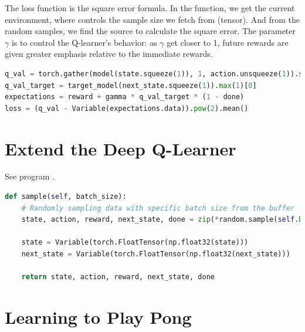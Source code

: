 \documentclass[12pt]{article}
\newcommand{\1}{\mathds{1}}
\newcommand{\<}{\langle}
\renewcommand{\>}{\rangle}
\begin{document}
The loss function is the square error formula.
In the function, we get the current environment,
where  controls the sample size we fetch from  (tensor).
And from the random samples, we find the source to calculate the square error.
The parameter $\gamma$ is to control the Q-learner's behavior:
as $\gamma$ get closer to 1,
future rewards are given greater emphasis relative to the immediate rewards.

\begin{lstlisting}[language=Python]
q_val = torch.gather(model(state.squeeze(1)), 1, action.unsqueeze(1)).squeeze(1) # y_i
q_val_target = target_model(next_state.squeeze(1)).max(1)[0]
expectations = reward + gamma * q_val_target * (1 - done) 
loss = (q_val - Variable(expectations.data)).pow(2).mean()
\end{lstlisting}


\section{Extend the Deep Q-Learner}

See program .
\begin{lstlisting}[language=Python]
def sample(self, batch_size):
    # Randomly sampling data with specific batch size from the buffer
    state, action, reward, next_state, done = zip(*random.sample(self.buffer, batch_size))

    state = Variable(torch.FloatTensor(np.float32(state)))
    next_state = Variable(torch.FloatTensor(np.float32(next_state)))

    return state, action, reward, next_state, done
\end{lstlisting}


\section{Learning to Play Pong}
\end{document}
